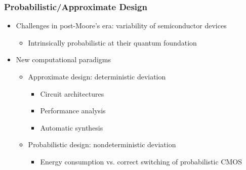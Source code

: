 \begin{frame}
    \frametitle{Probabilistic/Approximate Design}
    \begin{itemize}
        \item Challenges in post-Moore's era: variability of semiconductor devices
              \pause
              \begin{itemize}
                  \item Intrinsically probabilistic at their quantum foundation
                        \pause
              \end{itemize}
        \item New computational paradigms
              \pause
              \begin{itemize}
                  \item Approximate design: deterministic deviation
                        \pause
                        \begin{itemize}
                            \item Circuit architectures~\cite{Kahng2012,Ye2013,Kim2013}
                                  \pause
                            \item Performance analysis~\cite{Li2014,Venkatesan2011ApproxDesign}
                                  \pause
                            \item Automatic synthesis~\cite{Miao2013,Miao2014,Mrazek2016,Rehman2016,Venkataramani2012}
                                  \pause
                        \end{itemize}
                  \item Probabilistic design: nondeterministic deviation
                        \pause
                        \begin{itemize}
                            \item Energy consumption vs. correct switching of probabilistic CMOS~\cite{Chakrapani2006ProbDesign}
                        \end{itemize}
              \end{itemize}
    \end{itemize}
\end{frame}

